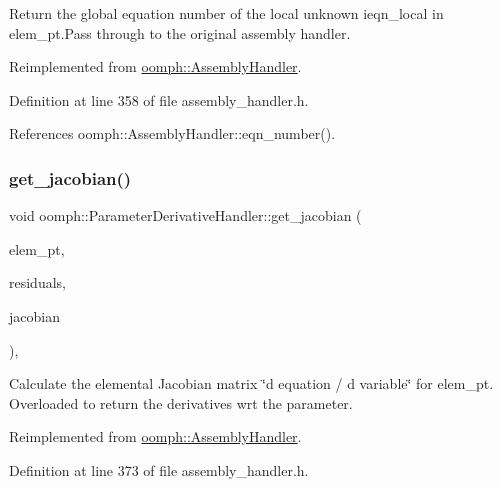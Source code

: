 Return the global equation number of the local unknown ieqn\+\_\+local in elem\+\_\+pt.\+Pass through to the original assembly handler. 



Reimplemented from \hyperlink{classoomph_1_1AssemblyHandler_a94d28e2de2559cde803d1ba2195b5290}{oomph\+::\+Assembly\+Handler}.



Definition at line 358 of file assembly\+\_\+handler.\+h.



References oomph\+::\+Assembly\+Handler\+::eqn\+\_\+number().

\mbox{\label{classoomph_1_1ParameterDerivativeHandler_a0bdfd879c1e63cc74923cf956b4f4310}} 
\subsubsection{\texorpdfstring{get\+\_\+jacobian()}{get\_jacobian()}}
{\footnotesize\ttfamily void oomph\+::\+Parameter\+Derivative\+Handler\+::get\+\_\+jacobian (\begin{DoxyParamCaption}\item[{\hyperlink{classoomph_1_1GeneralisedElement}{Generalised\+Element} $\ast$const \&}]{elem\+\_\+pt,  }\item[{\hyperlink{classoomph_1_1Vector}{Vector}$<$ double $>$ \&}]{residuals,  }\item[{\hyperlink{classoomph_1_1DenseMatrix}{Dense\+Matrix}$<$ double $>$ \&}]{jacobian }\end{DoxyParamCaption})\hspace{0.3cm}{\ttfamily [inline]}, {\ttfamily [virtual]}}



Calculate the elemental Jacobian matrix \char`\"{}d equation 
/ d variable\char`\"{} for elem\+\_\+pt. Overloaded to return the derivatives wrt the parameter. 



Reimplemented from \hyperlink{classoomph_1_1AssemblyHandler_ad43c3d8760be0ba6ebee8d82509458e5}{oomph\+::\+Assembly\+Handler}.



Definition at line 373 of file assembly\+\_\+handler.\+h.



